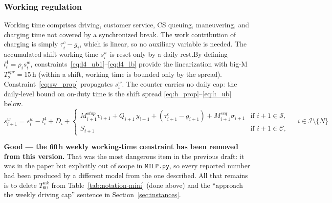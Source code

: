 \subsubsection{Working regulation}
Working time comprises driving, customer service, CS queuing, maneuvering, and charging time not covered by a synchronized break. The work contribution of charging is simply $\tau^c_i - g_i$, which is linear, so no auxiliary variable is needed. The accumulated shift working time $s_i^w$ is reset only by a daily rest.By defining $l^4_i = \rho_i s^w_i$,  constraints~\eqref{eq:l4_ub1}--\eqref{eq:l4_lb} provide the linearization with big-M $T^{spr}_2 = 15$\,h (within a shift, working time is bounded only by the spread). Constraint~\eqref{eq:sw_prop} propagates $s^w_i$. The counter carries no daily cap: the daily-level bound on on-duty time is the shift spread \eqref{eq:h_prop}--\eqref{eq:h_ub} below.
\begin{equation}
    s_{i+1}^w = s_i^w - l_i^4 + D_i
    + \begin{cases}
         M_{i+1}^{stop} v_{i+1} + Q_{i+1}\, y_{i+1} + (\tau^c_{i+1} - g_{i+1}) + M_{i+1}^{seq} \sigma_{i+1}  & \text{if } i+1 \in \mathcal{S}, \\
        S_{i+1}                      & \text{if } i+1 \in \mathcal{C},
    \end{cases}
    \quad \, i \in \mathcal{I}\setminus\{N\}
    \label{eq:sw_prop}
\end{equation}

\begin{acmt}
\textbf{Good --- the 60\,h weekly working-time constraint has been removed from
this version.} That was the most dangerous item in the previous draft: it was in
the paper but explicitly out of scope in \texttt{MILP.py}, so every reported
number had been produced by a different model from the one described. All that
remains is to delete $T^{wk}_{60}$ from Table~\ref{tab:notation-mini} (done
above) and the ``approach the weekly driving cap'' sentence in
Section~\ref{sec:instances}.
\end{acmt}

